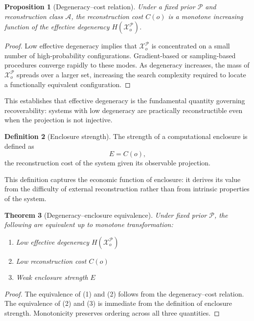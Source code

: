 \documentclass[12pt, oneside]{article}
\theoremstyle{plain}
\newtheorem{theorem}{Theorem}[section]
\newtheorem{proposition}[theorem]{Proposition}
\theoremstyle{definition}
\newtheorem{definition}[theorem]{Definition}
\theoremstyle{remark}
\newcommand{\config}{\mathcal{X}}
\newcommand{\prior}{\mathcal{P}}
\begin{document}
\begin{proposition}[Degeneracy--cost relation]
Under a fixed prior $\prior$ and reconstruction class $\mathcal{A}$, the reconstruction
cost $C(o)$ is a monotone increasing function of the effective degeneracy
$H(\config_o^{\prior})$.
\end{proposition}

\begin{proof}
Low effective degeneracy implies that $\config_o^{\prior}$ is concentrated on a small
number of high-probability configurations. Gradient-based or sampling-based procedures
converge rapidly to these modes. As degeneracy increases, the mass of $\config_o^{\prior}$
spreads over a larger set, increasing the search complexity required to locate a
functionally equivalent configuration.
\end{proof}

This establishes that effective degeneracy is the fundamental quantity governing
recoverability: systems with low degeneracy are practically reconstructible even when
the projection is not injective.

\begin{definition}[Enclosure strength]
The strength of a computational enclosure is defined as
\[
  E = C(o),
\]
the reconstruction cost of the system given its observable projection.
\end{definition}

This definition captures the economic function of enclosure: it derives its value
from the difficulty of external reconstruction rather than from intrinsic properties
of the system.

\begin{theorem}[Degeneracy--enclosure equivalence]
Under fixed prior $\prior$, the following are equivalent up to monotone transformation:
\begin{enumerate}[leftmargin=2em]
\item Low effective degeneracy $H(\config_o^{\prior})$
\item Low reconstruction cost $C(o)$
\item Weak enclosure strength $E$
\end{enumerate}
\end{theorem}

\begin{proof}
The equivalence of (1) and (2) follows from the degeneracy--cost relation. The
equivalence of (2) and (3) is immediate from the definition of enclosure strength.
Monotonicity preserves ordering across all three quantities.
\end{proof}
\end{document}
